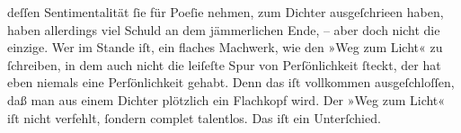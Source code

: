               deſſen Sentimentalität{ }ſie für Poeſie nehmen, zum Dichter ausgeſchrieen haben, haben
               allerdings viel Schuld an dem jämmerlichen Ende, – aber doch nicht die einzige. Wer
               im Stande iſt, ein flaches Machwerk, wie den »Weg zum
                  Licht« zu{ }ſchreiben, in dem auch nicht die leiſeſte Spur von Perſönlichkeit{ }ſteckt, der hat eben niemals eine Perſönlichkeit gehabt. Denn das iſt vollkommen
               ausgeſchloſſen, daß man aus einem Dichter {\pb}plötzlich
               ein Flachkopf wird. Der »Weg zum Licht« iſt
               nicht verfehlt,{ }ſondern complet talentlos. Das iſt ein Unterſchied.\pend
           
